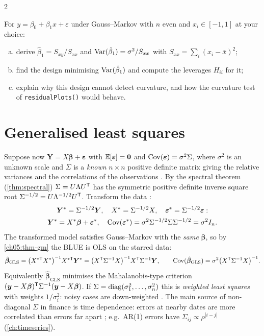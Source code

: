 \begin{paracol}{2}
\begin{exercise}
For $y=\beta_0+\beta_1x+\varepsilon$ under Gauss--Markov with $n$ even and $x_i\in[-1,1]$ at your choice:
\begin{enumerate}[(a)]
  \item derive
      $\hat\beta_1=S_{xy}/S_{xx}$ and $\operatorname{Var}(\hat\beta_1)=\sigma^2/S_{xx}$ with $S_{xx}=\sum_i(x_i-\bar x)^2$;
  \item find the design minimising
      $\operatorname{Var}(\hat\beta_1)$ and compute the leverages $H_{ii}$ for it;
  \item explain why this design cannot detect curvature, and how the
      curvature test of \texttt{residualPlots()} would behave.
\end{enumerate}
\end{exercise}

\section{Generalised least squares}\label{ch05:sec-gls}
Suppose now $\bm Y=X\bm\beta+\bm\varepsilon$ with $\mathbb{E}[\bm\varepsilon]=\bm 0$ and $\operatorname{Cov}(\bm\varepsilon)=\sigma^2\Sigma$, where $\sigma^2$ is an unknown scale
and $\Sigma$ is a \emph{known} $n\times n$ positive definite matrix giving the relative variances and the
correlations of the observations  . By the spectral theorem
(\cref{thm:spectral}) $\Sigma=U\Lambda U^{\mathsf T}$ has the symmetric positive definite inverse square root
$\Sigma^{-1/2}=U\Lambda^{-1/2}U^{\mathsf T}$. Transform the data  :
\[\begin{gathered}
  \bm Y^*=\Sigma^{-1/2}\bm Y,\quad X^*=\Sigma^{-1/2}X,\quad \bm\varepsilon^*=\Sigma^{-1/2}\bm\varepsilon:\\
  \bm Y^*=X^*\bm\beta+\bm\varepsilon^*,\quad \operatorname{Cov}(\bm\varepsilon^*)=\sigma^2\Sigma^{-1/2}\Sigma\Sigma^{-1/2}=\sigma^2I_n .
\end{gathered}\]
The transformed model satisfies Gauss--Markov with the \emph{same} $\bm\beta$, so by \cref{ch05:thm-gm} the BLUE is
OLS on the starred data:
\begin{equation}\label{ch05:eq-gls}
  \hat{\bm\beta}_{\text{GLS}}=\bigl(X^{*\mathsf T}X^*\bigr)^{-1}X^{*\mathsf T}\bm Y^*=\bigl(X^{\mathsf T}\Sigma^{-1}X\bigr)^{-1}X^{\mathsf T}\Sigma^{-1}\bm Y,
  \qquad \operatorname{Cov}(\hat{\bm\beta}_{\text{GLS}})=\sigma^2\bigl(X^{\mathsf T}\Sigma^{-1}X\bigr)^{-1}.
\end{equation}
Equivalently $\hat{\bm\beta}_{\text{GLS}}$ minimises the Mahalanobis-type criterion $(\bm y-X\bm\beta)^{\mathsf T}\Sigma^{-1}(\bm y-X\bm\beta)$. If
$\Sigma=\operatorname{diag}(\sigma_1^2,\dots,\sigma_n^2)$ this is \emph{weighted least squares} with weights $1/\sigma_i^2$: noisy cases are
down-weighted  . The main source of non-diagonal $\Sigma$ in finance is time
dependence: errors at nearby dates are more correlated than errors far apart ; e.g.\ AR(1)
errors have $\Sigma_{ij}\propto\rho^{|i-j|}$ (\cref{ch:timeseries}).


\end{paracol}
